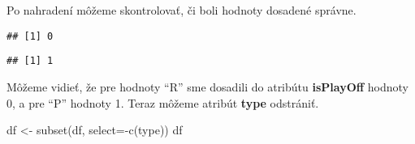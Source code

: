 \documentclass[
]{article}
\newenvironment{Shaded}{\begin{snugshade}}{\end{snugshade}}
\newcommand{\AttributeTok}[1]{\textcolor[rgb]{0.77,0.63,0.00}{#1}}
\newcommand{\FunctionTok}[1]{\textcolor[rgb]{0.00,0.00,0.00}{#1}}
\newcommand{\NormalTok}[1]{#1}
\newcommand{\OtherTok}[1]{\textcolor[rgb]{0.56,0.35,0.01}{#1}}
\newcommand{\SpecialCharTok}[1]{\textcolor[rgb]{0.00,0.00,0.00}{#1}}
\newcommand{\StringTok}[1]{\textcolor[rgb]{0.31,0.60,0.02}{#1}}
\begin{document}
Po nahradení môžeme skontrolovať, či boli hodnoty dosadené správne.

\begin{Shaded}
\end{Shaded}

\begin{verbatim}
## [1] 0
\end{verbatim}

\begin{Shaded}
\end{Shaded}

\begin{verbatim}
## [1] 1
\end{verbatim}

Môžeme vidieť, že pre hodnoty ``R'' sme dosadili do atribútu
\textbf{isPlayOff} hodnoty 0, a pre ``P'' hodnoty 1. Teraz môžeme
atribút \textbf{type} odstrániť.

\begin{Shaded}
\begin{Highlighting}[]
\NormalTok{df }\OtherTok{\textless{}{-}} \FunctionTok{subset}\NormalTok{(df, }\AttributeTok{select=}\SpecialCharTok{{-}}\FunctionTok{c}\NormalTok{(type))}
\NormalTok{df}
\end{Highlighting}
\end{Shaded}
\end{document}
